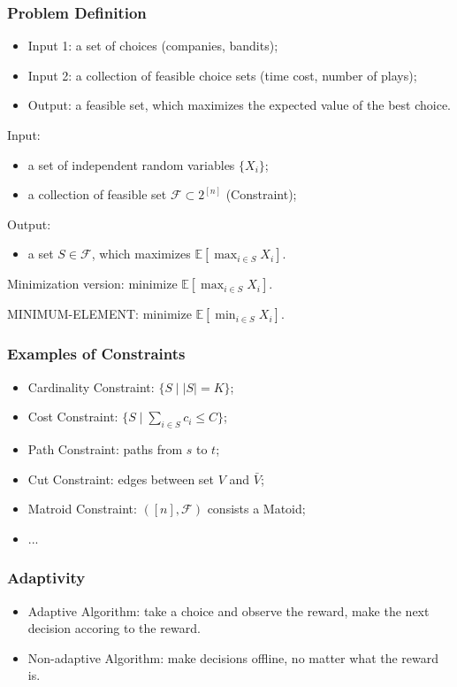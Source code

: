 \documentclass{beamer}
\newcommand{\calF}{{\mathcal F}}
\newcommand{\Exp}{{\mathbb{E}}}
\newcommand{\MM}{{\textsf{MAXIMUM-ELEMENT}}}
\newcommand{\mm}{{\textsf{MINIMUM-ELEMENT}}}
\begin{document}
\begin{frame}
\frametitle{Problem Definition}
    \begin{itemize}
    \item Input 1: a set of choices (companies, bandits);
	\item Input 2: a collection of feasible choice sets (time cost, number of plays);
	\item Output: a feasible set, which maximizes the expected value of the best choice.
	\end{itemize}
\begin{problem}[$\MM$]
Input:
\begin{itemize}
\item a set of independent random variables $\{X_i\}$;
\item a collection of feasible set $\calF \subset 2^{[n]}$ (Constraint);
\end{itemize}
Output:
\begin{itemize}
\item a set $S\in \calF$, which maximizes $\Exp[\max_{i\in S} X_i]$.
\end{itemize}
\end{problem}

Minimization version: minimize $\Exp[\max_{i\in S} X_i]$.

\mm: minimize $\Exp[\min_{i\in S} X_i]$.
\end{frame}

\begin{frame}
\frametitle{Examples of Constraints}
\begin{itemize}
\item Cardinality Constraint: $\{S \mid |S| = K\}$;
\item Cost Constraint: $\{S \mid \sum_{i\in S} c_i \leq C\}$;
\item Path Constraint: paths from $s$ to $t$;
\item Cut Constraint: edges between set $V$ and $\bar V$;
\item Matroid Constraint: $([n], \calF)$ consists a Matoid;
\item ...
\end{itemize}
\end{frame}

\begin{frame}
    \frametitle{Adaptivity}
    \begin{itemize}
        \item Adaptive Algorithm: take a choice and observe the reward, make the next decision accoring to the reward.
        \item Non-adaptive Algorithm: make decisions offline, no matter what the reward is.
    \end{itemize}
\end{frame}
\end{document}
